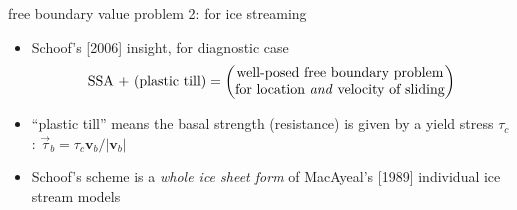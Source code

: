 \begin{frame}{free boundary value problem 2: for ice streaming}

\begin{itemize}
\item  Schoof's [2006]\nocite{SchoofStream} insight, for diagnostic case
  $$\text{SSA + (plastic till)} = \begin{pmatrix}
\text{well-posed free boundary problem} \\ \text{for location \emph{and} velocity of sliding}
\end{pmatrix} $$
\item ``plastic till'' means the basal strength (resistance) is given by a yield stress $\tau_c$:  \qquad $\vec\tau_b = \tau_c \mathbf{v}_b / |\mathbf{v}_b|$
\item Schoof's scheme is a \emph{whole ice sheet form} of MacAyeal's [1989]\nocite{MacAyeal} individual ice stream models
\end{itemize}


\end{frame}
